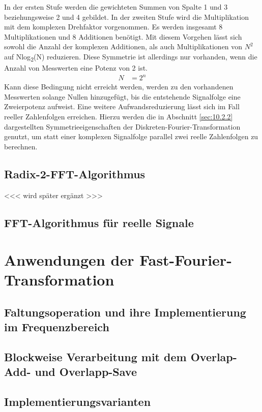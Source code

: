 In der ersten Stufe werden die gewichteten Summen von Spalte 1 und 3 beziehungsweise 2 und 4 gebildet. In der zweiten Stufe wird die Multiplikation mit dem komplexen Drehfaktor vorgenommen. Es werden insgesamt 8 Multiplikationen und 8 Additionen benötigt. Mit diesem Vorgehen lässt sich sowohl die Anzahl der komplexen Additionen, als auch Multiplikationen von \(N^{2}\) auf Nlog\textsubscript{2}(N) reduzieren. Diese Symmetrie ist allerdings nur vorhanden, wenn die Anzahl von Messwerten eine Potenz von 2 ist.
\begin{align}
N &= 2^{n} \label{eq:10.91}
\end{align}
Kann diese Bedingung nicht erreicht werden, werden zu den vorhandenen Messwerten solange Nullen hinzugefügt, bis die entstehende Signalfolge eine Zweierpotenz aufweist. Eine weitere Aufwandsreduzierung lässt sich im Fall reeller Zahlenfolgen erreichen. Hierzu werden die in Abschnitt \ref{sec:10.2.2} dargestellten Symmetrieeigenschaften der Diskreten-Fourier-Transformation genutzt, um statt einer komplexen Signalfolge parallel zwei reelle Zahlenfolgen zu berechnen.

\subsection{Radix-2-FFT-Algorithmus}\label{sec:radix-2-fft-algorithmus}

\textless\textless\textless{} wird später ergänzt \textgreater\textgreater\textgreater{}

\subsection{FFT-Algorithmus für reelle Signale}\label{sec:fft-algorithmus-fuxfcr-reelle-signale}

\section{Anwendungen der Fast-Fourier-Transformation}\label{sec:10.6}

\subsection{Faltungsoperation und ihre Implementierung im Frequenzbereich}\label{sec:faltungsoperation-und-ihre-implementierung-im-frequenzbereich}

\subsection{Blockweise Verarbeitung mit dem Overlap-Add- und Overlapp-Save}\label{sec:blockweise-verarbeitung-mit-dem-overlap-add--und-overlapp-save}

\subsection{Implementierungsvarianten}\label{sec:implementierungsvarianten}
